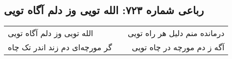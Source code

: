 \begin{center}
\section*{رباعی شماره ۷۲۳: الله تویی وز دلم آگاه تویی}
\label{sec:sh723}
\begin{longtable}{l p{0.5cm} r}
الله تویی وز دلم آگاه تویی
&&
درمانده منم دلیل هر راه تویی
\\
گر مورچه‌ای دم زند اندر تک چاه
&&
آگه ز دم مورچه در چاه تویی
\\
\end{longtable}
\end{center}
